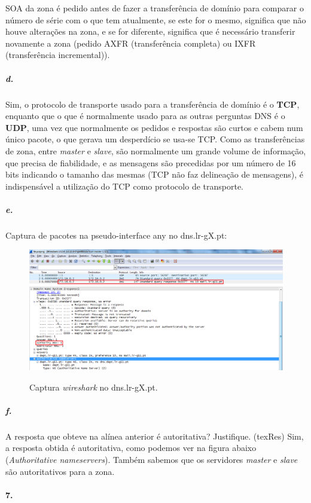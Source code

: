 SOA da zona é pedido antes de fazer a transferência de domínio para comparar o número de série com o que tem atualmente, se este for o mesmo, significa que não houve alterações na zona, e se for diferente, significa que é necessário transferir novamente a zona (pedido AXFR (transferência completa) ou IXFR (transferência incremental)).


\subparagraph{d.}
Sim, o protocolo de transporte usado para a transferência de domínio é o \textbf{TCP}, enquanto que o que é normalmente usado para as outras perguntas DNS é o \textbf{UDP}, uma vez que normalmente os pedidos e respostas são curtos e cabem num único pacote, o que gerava um desperdício se usa-se TCP.
Como as transferências de zona, entre \emph{master} e \emph{slave}, são normalmente um grande volume de informação, que precisa de fiabilidade, e as mensagens são precedidas por um número de 16 bits indicando o tamanho das mesmas (TCP não faz delineação de mensagens), é indispensável a utilização do TCP como protocolo de transporte.


\subparagraph{e.}
Captura de pacotes na pseudo-interface \textsf{any} no dns.lr-gX.pt:

\begin{figure}[h]
\centering
\includegraphics[width=1\textwidth, height=0.35\textheight]{6e_cap.png}
\label{fig:2-capturaWireshark}
\caption{Captura \emph{wireshark} no \textsf{dns.lr-gX.pt}.}
\end{figure}


\subparagraph{f.}
A resposta que obteve na alínea anterior é autoritativa? Justifique. (texRes)
Sim, a resposta obtida é autoritativa, como podemos ver na figura abaixo (\emph{Authoritative nameservers}).
Também sabemos que os servidores \emph{master} e \emph{slave} são autoritativos para a zona.


\paragraph{7.}

